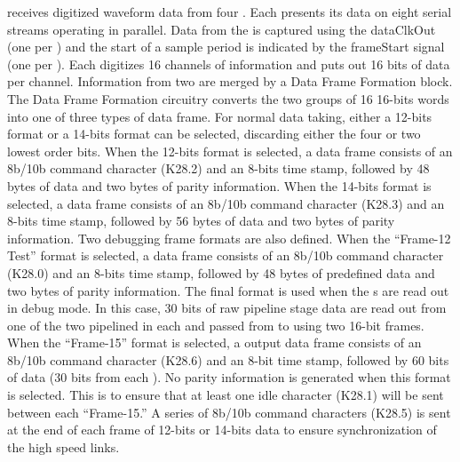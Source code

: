  receives digitized waveform data from 
four  . Each  presents its data on eight 
serial streams operating in parallel. Data from the  is captured 
using the  dataClkOut (one per ) and the start of a 
sample period is indicated by the frameStart signal (one per ). 
Each  digitizes 16 channels of information and puts out 16 bits 
of data per channel. Information from two  are merged by a Data 
Frame Formation block. The Data Frame Formation circuitry converts the two 
groups of 16 16-bits words into one of three types of data frame. For normal 
data taking, either a 12-bits format or a 14-bits  format can be 
selected, discarding either the four or two lowest order bits. When the 
12-bits format is selected, a data frame consists of an 8b/10b command 
character (K28.2) and an 8-bits time stamp, followed by 48 bytes of  
data and two bytes of parity information. When the 14-bits format is selected, 
a data frame consists of an 8b/10b command character (K28.3) and an 8-bits time 
stamp, followed by 56 bytes of  data and two bytes of parity 
information. Two debugging frame formats are also defined. When the ``Frame-12 Test'' 
format is selected, a data frame consists of an 8b/10b command character 
(K28.0) and an 8-bits time stamp, followed by 48 bytes of predefined data 
and two bytes of parity information. The final format is used when the 
s are read out in debug mode. In this case, 30 bits of raw 
pipeline stage data are read out from one of the two pipelined  
in each   and passed from  to 
 using two 16-bit frames. When the ``Frame-15'' format is 
selected, a  output data frame consists of an 8b/10b command 
character (K28.6) and an 8-bit time stamp, followed by 60 bits of  
data (30 bits from each ). No parity information is generated 
when this format is selected. This is to ensure that at least one idle 
character (K28.1) will be sent between each ``Frame-15.'' A series of 8b/10b 
command characters (K28.5) is sent at the end of each frame of 12-bits or 
14-bits data to ensure synchronization of the high speed links.

